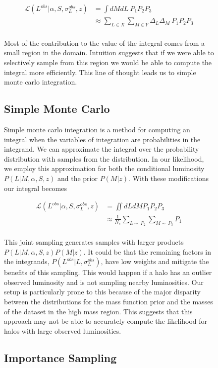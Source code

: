 \documentclass[\docopts]{\docclass}
\begin{document}
\begin{figure}[h!]
\begin{align*}
\mathcal{L}(L^{obs}|\alpha, S, \sigma_L^{obs}, z) &= \int dMdL\ P_1P_2P_3\\
&\approx \sum_{L \in X}\sum_{M \in Y} \Delta_L\Delta_M\ P_1P_2P_3\\
\end{align*}

Most of the contribution to the value of the integral comes from a small region in the domain. 
Intuition suggests that if we were able to selectively sample from this region we would be able to compute the integral more efficiently. 
This line of thought leads us to simple monte carlo integration.


\subsection{Simple Monte Carlo}
\label{subsec:smc}

Simple monte carlo integration is a method for computing an integral when the variables of integration are probabilities in the integrand.
We can approximate the integral over the probability distribution with samples from the distribution. 
In our likelihood, we employ this approximation for both the conditional luminosity $P(L|M, \alpha, S, z)$ and the prior $P(M|z)$. With these modifications our integral becomes

\begin{align*}
\mathcal{L}(L^{obs}|\alpha, S, \sigma_L^{obs},z) &= \iint dLdM P_1P_2P_3\\
&\approx \frac{1}{N_s}\sum_{L \sim\ P_2}\sum_{M \sim\ P_3} P_1\\
\end{align*}

This joint sampling generates samples with larger products $P(L|M, \alpha, S, z)P(M|z)$.
It could be that the remaining factors in the integrands, $P(L^{obs}|L, \sigma_L^{obs})$, have low weights and mitigate the benefits of this sampling.
This would happen if a halo has an outlier observed luminosity and is not sampling nearby luminosities.
Our setup is particularly prone to this because of the major disparity between the distributions for the mass function prior and the masses of the dataset in the high mass region. 
This suggests that this approach may not be able to accurately compute the likelihood for halos with large observed luminosities.

\subsection{Importance Sampling}
\label{subsec:is}


\end{figure}
\end{document}
